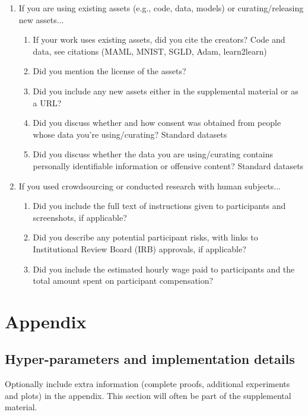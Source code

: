 \documentclass{article}
\theoremstyle{definition}
\begin{document}
\begin{enumerate}
	
	\item If you are using existing assets (e.g., code, data, models) or curating/releasing new assets...
	\begin{enumerate}
		\item If your work uses existing assets, did you cite the creators?
		\answerYes{} Code and data, see citations (MAML, MNIST, SGLD, Adam, learn2learn)
		\item Did you mention the license of the assets?
		\answerTODO{}
		\item Did you include any new assets either in the supplemental material or as a URL?
		\answerYes{}
		\item Did you discuss whether and how consent was obtained from people whose data you're using/curating?
		\answerNA{} Standard datasets
		\item Did you discuss whether the data you are using/curating contains personally identifiable information or offensive content?
		\answerNA{} Standard datasets
	\end{enumerate}
	
	
	\item If you used crowdsourcing or conducted research with human subjects...
	\begin{enumerate}
		\item Did you include the full text of instructions given to participants and screenshots, if applicable?
		\answerNA{}
		\item Did you describe any potential participant risks, with links to Institutional Review Board (IRB) approvals, if applicable?
		\answerNA{}
		\item Did you include the estimated hourly wage paid to participants and the total amount spent on participant compensation?
		\answerNA{}
	\end{enumerate}
	
	
\end{enumerate}

\appendix
\section{Appendix}

\subsection{Hyper-parameters and implementation details} \label{append:hyper-params}



Optionally include extra information (complete proofs, additional experiments and plots) in the appendix.
This section will often be part of the supplemental material.
\end{document}
